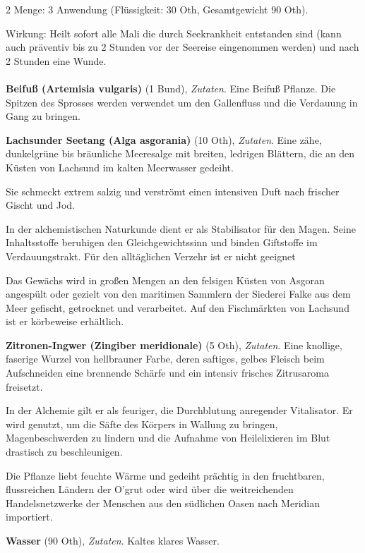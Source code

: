 \begin{multicols}{2}
Menge:
3 Anwendung (Flüssigkeit: 30 Oth, Gesamtgewicht 90 Oth).

Wirkung:
Heilt sofort alle Mali die durch Seekrankheit entstanden sind (kann auch präventiv bis zu 2 Stunden vor der Seereise eingenommen werden) und nach 2 Stunden eine Wunde.

    \paragraph{}
    \begin{denseitemize}
        \item \textbf{Beifuß (Artemisia vulgaris)} (1 Bund), \textit{Zutaten}.
        Eine Beifuß Pflanze. Die Spitzen des Sprosses werden verwendet um den Gallenfluss und die Verdauung in Gang zu bringen.
        \item \textbf{Lachsunder Seetang (Alga asgorania)} (10 Oth), \textit{Zutaten}.
        Eine zähe, dunkelgrüne bis bräunliche Meeresalge mit breiten, ledrigen Blättern, die an den Küsten von Lachsund im kalten Meerwasser gedeiht.

Sie schmeckt extrem salzig und verströmt einen intensiven Duft nach frischer Gischt und Jod.

In der alchemistischen Naturkunde dient er als Stabilisator für den Magen. Seine Inhaltsstoffe beruhigen den Gleichgewichtssinn und binden Giftstoffe im Verdauungstrakt. Für den alltäglichen Verzehr ist er nicht geeignet

Das Gewächs wird in großen Mengen an den felsigen Küsten von Asgoran angespült oder gezielt von den maritimen Sammlern der Siederei Falke aus dem Meer gefischt, getrocknet und verarbeitet. Auf den Fischmärkten von Lachsund ist er körbeweise erhältlich.
        \item \textbf{Zitronen-Ingwer (Zingiber meridionale)} (5 Oth), \textit{Zutaten}.
        Eine knollige, faserige Wurzel von hellbrauner Farbe, deren saftiges, gelbes Fleisch beim Aufschneiden eine brennende Schärfe und ein intensiv frisches Zitrusaroma freisetzt.

In der Alchemie gilt er als feuriger, die Durchblutung anregender Vitalisator. Er wird genutzt, um die Säfte des Körpers in Wallung zu bringen, Magenbeschwerden zu lindern und die Aufnahme von Heilelixieren im Blut drastisch zu beschleunigen.

Die Pflanze liebt feuchte Wärme und gedeiht prächtig in den fruchtbaren, flussreichen Ländern der O'grut oder wird über die weitreichenden Handelsnetzwerke der Menschen aus den südlichen Oasen nach Meridian importiert.
        \item \textbf{Wasser} (90 Oth), \textit{Zutaten}.
        Kaltes klares Wasser.
    \end{denseitemize}



\end{multicols}
